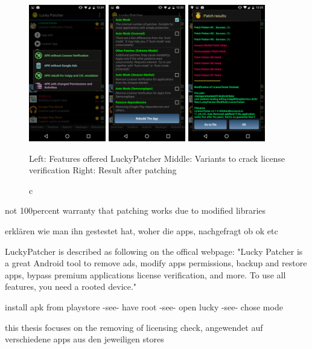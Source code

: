 \begin{figure}[h]
    \centering
    \includegraphics[width=0.3\textwidth]{data/luckyFeatures.png}
    \includegraphics[width=0.3\textwidth]{data/luckyModi.png}
    \includegraphics[width=0.3\textwidth]{data/luckyPatching.png}
    \caption{c}{Left: Features offered LuckyPatcher
    Middle: Variants to crack license verification
    Right: Result after patching}
    \label{fig:luckyInapp}
\end{figure}

not 100percent warranty that patching works due to modified libraries


erklären wie man ihn gestestet hat, woher die apps, nachgefragt ob ok etc

LuckyPatcher is described as following on the offical webpage: "Lucky Patcher is a great Android tool to remove ads, modify apps permissions, backup and restore apps, bypass premium applications license verification, and more. To use all features, you need a rooted device." \cite{luckyPatcherOfficial}

install apk from playstore -see- have root -see- open lucky -see- chose mode


this thesis focuses on the removing of licensing check, angewendet auf verschiedene apps aus den jeweiligen stores

